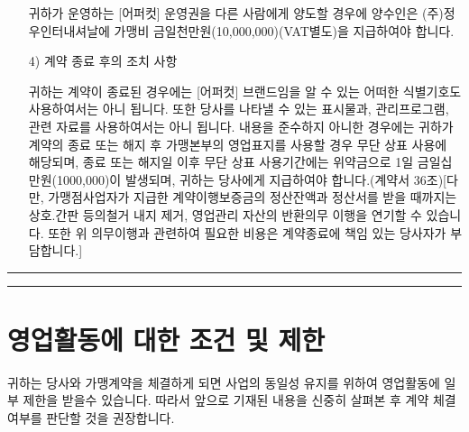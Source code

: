 \documentclass[a5paper,10pt]{oblivoir}
\newcommand\crule[3][black]{\textcolor{#1}{\rule{#2}{#3}}}
\begin{document}
\begin{enumerate}
귀하가 운영하는 [어퍼컷] 운영권을 다른 사람에게 양도할 경우에 양수인은 (주)정우인터내셔날에 가맹비
금일천만원(10,000,000)(VAT별도)을 지급하여야 합니다.

\item[4)] 계약 종료 후의 조치 사항

귀하는 계약이 종료된 경우에는 [어퍼컷] 브랜드임을 알 수 있는 어떠한 식별기호도 사용하여서는 아니 됩니다. 또한 당사를 나타낼 수 있는 표시물과, 관리프로그램, 관련 자료를 사용하여서는 아니 됩니다. 내용을 준수하지 아니한 경우에는 귀하가 계약의 종료 또는 해지 후 가맹본부의 영업표지를 사용할 경우 무단 상표 사용에 해당되며, 종료 또는 해지일 이후 무단 상표 사용기간에는 위약금으로 1일 금일십만원(1000,000)이 발생되며, 귀하는 당사에게 지급하여야 합니다.(계약서 36조)[다만, 가맹점사업자가 지급한 계약이행보증금의 정산잔액과 정산서를 받을 때까지는 상호.간판 등의철거 내지 제거, 영업관리 자산의 반환의무 이행을 연기할 수 있습니다. 또한 위 의무이행과 관련하여 필요한 비용은 계약종료에 책임 있는 당사자가 부담합니다.]
\end{enumerate}

\newpage
\begin{center}
\crule[red]{4cm}{0.1cm} \crule[blue]{4cm}{0.1cm}
\end{center}
\section{ 영업활동에 대한 조건 및 제한}

귀하는 당사와 가맹계약을 체결하게 되면 사업의 동일성 유지를 위하여 영업활동에 일부 제한을 받을수 있습니다. 따라서 앞으로 기재된 내용을 신중히 살펴본 후 계약 체결 여부를 판단할 것을 권장합니다.
\end{document}
